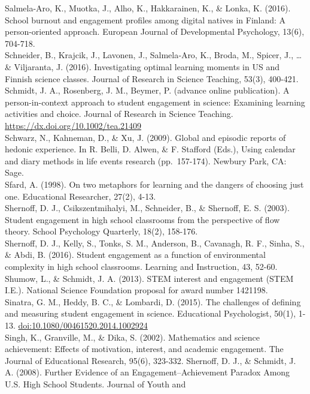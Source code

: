 \documentclass[]{msu-thesis}
\theoremstyle{definition}
\theoremstyle{definition}
\theoremstyle{definition}
\theoremstyle{remark}
\begin{document}
Salmela-Aro, K., Muotka, J., Alho, K., Hakkarainen, K., \& Lonka, K.
(2016). School burnout and engagement profiles among digital natives in
Finland: A person-oriented approach. European Journal of Developmental
Psychology, 13(6), 704-718.\\
Schneider, B., Krajcik, J., Lavonen, J., Salmela‐Aro, K., Broda, M.,
Spicer, J., \ldots{} \& Viljaranta, J. (2016). Investigating optimal
learning moments in US and Finnish science classes. Journal of Research
in Science Teaching, 53(3), 400-421.\\
Schmidt, J. A., Rosenberg, J. M., Beymer, P. (advance online
publication). A person-in-context approach to student engagement in
science: Examining learning activities and choice. Journal of Research
in Science Teaching. \url{https://dx.doi.org/10.1002/tea.21409}\\
Schwarz, N., Kahneman, D., \& Xu, J. (2009). Global and episodic reports
of hedonic experience. In R. Belli, D. Alwen, \& F. Stafford (Eds.),
Using calendar and diary methods in life events research (pp.~157-174).
Newbury Park, CA: Sage.\\
Sfard, A. (1998). On two metaphors for learning and the dangers of
choosing just one. Educational Researcher, 27(2), 4-13.\\
Shernoff, D. J., Csikszentmihalyi, M., Schneider, B., \& Shernoff, E. S.
(2003). Student engagement in high school classrooms from the
perspective of flow theory. School Psychology Quarterly, 18(2),
158-176.\\
Shernoff, D. J., Kelly, S., Tonks, S. M., Anderson, B., Cavanagh, R. F.,
Sinha, S., \& Abdi, B. (2016). Student engagement as a function of
environmental complexity in high school classrooms. Learning and
Instruction, 43, 52-60.\\
Shumow, L., \& Schmidt, J. A. (2013). STEM interest and engagement (STEM
I.E.). National Science Foundation proposal for award number 1421198.\\
Sinatra, G. M., Heddy, B. C., \& Lombardi, D. (2015). The challenges of
defining and measuring student engagement in science. Educational
Psychologist, 50(1), 1-13. \url{doi:10.1080/00461520.2014.1002924}\\
Singh, K., Granville, M., \& Dika, S. (2002). Mathematics and science
achievement: Effects of motivation, interest, and academic engagement.
The Journal of Educational Research, 95(6), 323-332. Shernoff, D. J., \&
Schmidt, J. A. (2008). Further Evidence of an Engagement--Achievement
Paradox Among U.S. High School Students. Journal of Youth and
\end{document}

